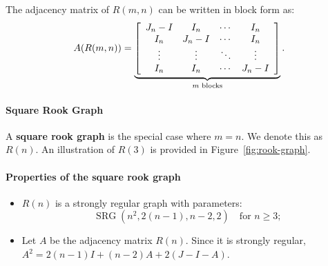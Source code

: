 The adjacency matrix of \( R(m,n) \) can be written in block form as:
\[
A(R(m,n)) = 
\underbrace{
\left[
\begin{array}{cccc}
J_{n} - I & I_n & \cdots & I_n \\
I_n & J_n - I & \cdots & I_n \\
\vdots & \vdots & \ddots & \vdots \\
I_n & I_n & \cdots & J_n - I
\end{array}
\right]
}_{\text{\( m \) blocks}}.
\]

\paragraph{Square Rook Graph}
A \textbf{square rook graph} is the special case where \( m = n \). We denote this as \( R(n) \).
An illustration of \( R(3) \) is provided in Figure~\ref{fig:rook-graph}.

\paragraph{Properties of the square rook graph}
\begin{itemize}
    \item \( R(n) \) is a strongly regular graph with parameters:
    \[
    \operatorname{SRG}(n^2, 2(n - 1), n - 2, 2)\quad \text{for }n \ge 3;
    \]
    \item Let $A$ be the adjacency matrix $R(n)$. Since it is strongly regular, $A^2 = 2(n-1)I + (n-2)A + 2(J-I-A)$.
\end{itemize}






